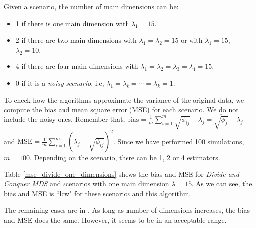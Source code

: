 \documentclass[11pt]{report}
\begin{document}
Given a scenario, the number of main dimensions can be:

\begin{itemize}
\item 1 if there is one main dimension with $\lambda_1  = 15$.

\item 2 if there are two main dimensions with $\lambda_1  = \lambda_2 = 15$ or
with $\lambda_1  = 15$, $\lambda_2 =10$.

\item 4 if there are four main dimensions with 
$\lambda_1  = \lambda_2 = \lambda_3 = \lambda_4 = 15$.

\item 0 if it is a \textit{noisy scenario}, i.e, 
$\lambda_1  = \lambda_k = \cdots = \lambda_k = 1$.

\end{itemize}

\indent To check how the algorithms approximate the variance of the original 
data, we compute the bias and mean square error (MSE) for each scenario. We do 
not include the noisy ones. Remember that, 
$\mbox{bias} = \frac{1}{m}\sum_{i=1}^m \sqrt{\phi_{ij}} - \lambda_j = \overline{\sqrt{\phi_j}} - \lambda_j$ 
and $\mbox{MSE} = \frac{1}{m} \sum_{i = 1} ^m (\lambda_j - \sqrt{\phi_{ij}})^2$.
Since we have performed 100 simulations, $m = 100$. Depending on the scenario, 
there can be 1, 2 or 4 estimators. 

\indent Table \ref{mse_divide_one_dimensions} shows the bias and MSE for 
\textit{Divide and Conquer MDS} and scenarios with one main dimension 
$\lambda = 15$. As we can see, the bias and MSE is ``low" for these 
scenarios and this algorithm.

\indent The remaining cases are in . As long as number of 
dimensions increases, the bias and MSE does the same. However, it seems to
be in an acceptable range.
\end{document}
